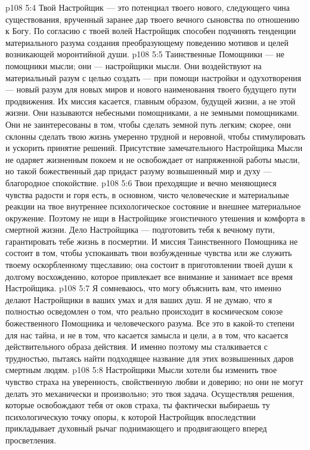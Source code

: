 \vs p108 5:4 \pc Твой Настройщик --- это потенциал твоего нового, следующего чина существования, врученный заранее дар твоего вечного сыновства по отношению к Богу. По согласию с твоей волей Настройщик способен подчинять тенденции материального разума создания преобразующему поведению мотивов и целей возникающей моронтийной души.
\vs p108 5:5 Таинственные Помощники --- не помощники мысли; они --- настройщики мысли. Они воздействуют на материальный разум с целью создать --- при помощи настройки и одухотворения --- новый разум для новых миров и нового наименования твоего будущего пути продвижения. Их миссия касается, главным образом, будущей жизни, а не этой жизни. Они называются небесными помощниками, а не земными помощниками. Они не заинтересованы в том, чтобы сделать земной путь легким; скорее, они склонны сделать твою жизнь умеренно трудной и неровной, чтобы стимулировать и ускорить принятие решений. Присутствие замечательного Настройщика Мысли не одаряет жизненным покоем и не освобождает от напряженной работы мысли, но такой божественный дар придаст разуму возвышенный мир и духу --- благородное спокойствие.
\vs p108 5:6 Твои преходящие и вечно меняющиеся чувства радости и горя есть, в основном, чисто человеческие и материальные реакции на твое внутреннее психологическое состояние и внешнее материальное окружение. Поэтому не ищи в Настройщике эгоистичного утешения и комфорта в смертной жизни. Дело Настройщика --- подготовить тебя к вечному пути, гарантировать тебе жизнь в посмертии. И миссия Таинственного Помощника не состоит в том, чтобы успокаивать твои возбужденные чувства или же служить твоему оскорбленному тщеславию; она состоит в приготовлении твоей души к долгому восхождению, которое привлекает все внимание и занимает все время Настройщика.
\vs p108 5:7 Я сомневаюсь, что могу объяснить вам, что именно делают Настройщики в ваших умах и для ваших душ. Я не думаю, что я полностью осведомлен о том, что реально происходит в космическом союзе божественного Помощника и человеческого разума. Все это в какой\hyp{}то степени для нас тайна, и не в том, что касается замысла и цели, а в том, что касается действительного образа действия. И именно поэтому мы сталкивается с трудностью, пытаясь найти подходящее название для этих возвышенных даров смертным людям.
\vs p108 5:8 Настройщики Мысли хотели бы изменить твое чувство страха на уверенность, свойственную любви и доверию; но они не могут делать это механически и произвольно; это твоя задача. Осуществляя решения, которые освобождают тебя от оков страха, ты фактически выбираешь ту психологическую точку опоры, к которой Настройщик впоследствии прикладывает духовный рычаг поднимающего и продвигающего вперед просветления.
